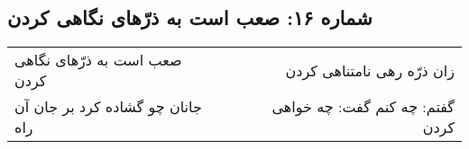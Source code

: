 \begin{center}
\section*{شماره ۱۶: صعب است به ذرّهای نگاهی کردن}
\label{sec:016}
\begin{longtable}{l p{0.5cm} r}
صعب است به ذرّهای نگاهی کردن
&&
زان ذرّه رهی نامتناهی کردن
\\
جانان چو گشاده کرد بر جان آن راه
&&
گفتم: چه کنم گفت: چه خواهی کردن
\\
\end{longtable}
\end{center}
